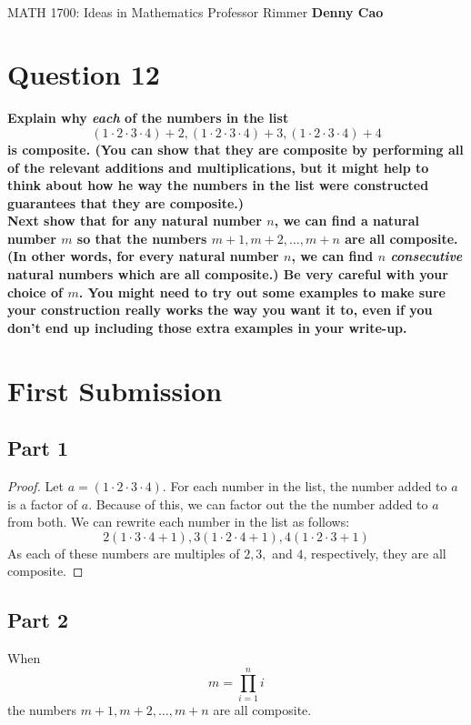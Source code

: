 \documentclass[article, 12pt]{article}
\title{\LARGE\bf{\psetName}}
\author{\name}
\date{\dueDate}
\author{\name}
\date{\dueDate}
\makeatletter
\theoremstyle{definition}
\newcommand{\courseNumber}{MATH 1700}
\newcommand{\courseName}{Ideas in Mathematics}
\newcommand{\professor}{Professor Rimmer}
\newcommand{\name}{Denny Cao}
\renewcommand{\maketitle}{\bgroup\setlength{\parindent}{0pt}
    \begin{flushleft}
        \textbf{\@title} \\ \vskip0.2cm
        \begingroup
            \fontsize{14pt}{12pt}\selectfont
            \courseNumber: \courseName 
            \vskip0.3cm 
            \professor
        \endgroup \vskip0.3cm
        \@date \hfill\rlap{}\bf{\name} \\ \vskip0.1cm
        \hrulefill
    \end{flushleft}\egroup 
}
\makeatother
\begin{document}
    \maketitle
    \thispagestyle{empty}
    \section*{Question 12}
    \doublespacing
    \textbf{Explain why \textit{each} of the numbers in the list}
    \[ (1 \cdot 2 \cdot 3 \cdot 4) + 2, (1 \cdot 2 \cdot 3 \cdot 4) + 3, (1 \cdot 2 \cdot 3 \cdot 4) + 4\]
    \textbf{is composite. (You can show that they are composite by performing all of the relevant additions and multiplications, but it might help to think about how he way the numbers in the list were constructed guarantees that they are composite.)}
    \\[12pt]
    \textbf{Next show that for any natural number $n$, we can find a natural number $m$ so that the numbers $m+1,m+2,\dots,m+n$ are all composite. (In other words, for every natural number $n$, we can find $n$ \textit{consecutive} natural numbers which are all composite.) Be very careful with your choice of $m$. You might need to try out some examples to make sure your construction really works the way you want it to, even if you don't end up including those extra examples in your write-up.}
    \pagebreak
    \section*{First Submission}
    \subsection*{Part 1}
    \begin{proof}
        Let $a = (1 \cdot 2 \cdot 3 \cdot 4)$. For each number in the list, the number added to $a$ is a factor of $a$. Because of this, we can factor out the the number added to $a$ from both. We can rewrite each number in the list as follows:
        \[ 2(1 \cdot 3 \cdot 4 + 1), 3(1 \cdot 2 \cdot 4 + 1), 4(1 \cdot 2 \cdot 3 + 1) \]
        As each of these numbers are multiples of $2,3,$ and $4$, respectively, they are all composite.
    \end{proof}
    \subsection*{Part 2}
    When  
    \[ m = \prod_{i=1}^{n} i \]
    the numbers $m+1,m+2,\dots,m+n$ are all composite.
\end{document}
